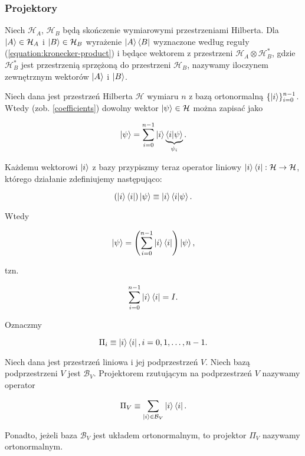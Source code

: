 \subsubsection{Projektory}

\begin{definition}
    Niech $\mathcal{H}_{A}$, $\mathcal{H}_{B}$ będą skończenie wymiarowymi przestrzeniami Hilberta. Dla $\ket{A} \in \mathcal{H}_A$ i $\ket{B} \in \mathcal{H}_B$ wyrażenie $\ket{A} \bra{B}$ wyznaczone według reguły (\ref{equation:kronecker-product}) i będące wektorem z przestrzeni $\mathcal{H}_A \otimes \mathcal{H}_{B} ^ {*}$, gdzie $\mathcal{H}_{B} ^ {*}$ jest przestrzenią sprzężoną do przestrzeni $\mathcal{H}_B$, nazywamy iloczynem zewnętrznym wektorów $\ket{A}$ i $\ket{B}$.
\end{definition}

Niech dana jest przestrzeń Hilberta $\mathcal{H}$ wymiaru $n$ z bazą ortonormalną $\{\ket{i}\}_{i = 0} ^ {n - 1}$. Wtedy (zob. \ref{coefficients}) dowolny wektor $\ket{\psi} \in \mathcal{H}$ można zapisać jako

$$
    \ket{\psi} = \sum\limits_{i = 0} ^ {n - 1} \ket{i} \underbrace{\bra{i}\ket{\psi}}_{\psi_{i}}.
$$

Każdemu wektorowi $\ket{i}$ z bazy przypiszmy teraz operator liniowy $\ket{i} \bra{i} : \mathcal{H} \rightarrow \mathcal{H}$, którego działanie zdefiniujemy następująco:

$$
    (\ket{i} \bra{i}) \ket{\psi} \equiv \ket{i} \bra{i}\ket{\psi}.
$$

Wtedy

$$
    \ket{\psi} = \left(\sum_{i = 0} ^ {n - 1} \ket{i} \bra{i} \right) \ket{\psi},
$$

tzn.

\begin{equation}
    \label{equation:identity}
    \sum\limits_{i = 0} ^ {n - 1} \ket{i} \bra{i} = I.
\end{equation}

Oznaczmy

$$
    \Pi_{i} \equiv \ket{i} \bra{i}, i = 0, 1, \ldots, n - 1.
$$

\begin{definition}
    Niech dana jest przestrzeń liniowa i jej podprzestrzeń $V$. Niech bazą podprzestrzeni $V$ jest $\mathcal{B}_{V}$. Projektorem rzutującym na podprzestrzeń $V$ nazywamy operator

    $$
        \Pi_V \equiv \sum\limits_{\ket{i} \in \mathcal{B}_V} \ket{i} \bra{i}.
    $$

    Ponadto, jeżeli baza $\mathcal{B}_V$ jest układem ortonormalnym, to projektor $\Pi_V$ nazywamy ortonormalnym.
\end{definition}

